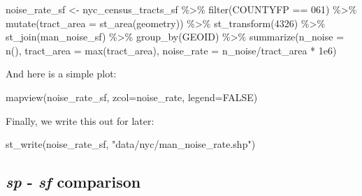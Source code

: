 \documentclass[
  11pt,
]{book}
\newenvironment{Shaded}{\begin{snugshade}}{\end{snugshade}}
\newcommand{\AttributeTok}[1]{\textcolor[rgb]{0.77,0.63,0.00}{#1}}
\newcommand{\ConstantTok}[1]{\textcolor[rgb]{0.00,0.00,0.00}{#1}}
\newcommand{\DecValTok}[1]{\textcolor[rgb]{0.00,0.00,0.81}{#1}}
\newcommand{\FloatTok}[1]{\textcolor[rgb]{0.00,0.00,0.81}{#1}}
\newcommand{\FunctionTok}[1]{\textcolor[rgb]{0.00,0.00,0.00}{#1}}
\newcommand{\NormalTok}[1]{#1}
\newcommand{\OtherTok}[1]{\textcolor[rgb]{0.56,0.35,0.01}{#1}}
\newcommand{\SpecialCharTok}[1]{\textcolor[rgb]{0.00,0.00,0.00}{#1}}
\newcommand{\StringTok}[1]{\textcolor[rgb]{0.31,0.60,0.02}{#1}}
\begin{document}
\begin{Shaded}
\begin{Highlighting}[]
\NormalTok{noise\_rate\_sf }\OtherTok{\textless{}{-}}\NormalTok{ nyc\_census\_tracts\_sf }\SpecialCharTok{\%\textgreater{}\%} 
      \FunctionTok{filter}\NormalTok{(COUNTYFP }\SpecialCharTok{==} \StringTok{\textquotesingle{}061\textquotesingle{}}\NormalTok{) }\SpecialCharTok{\%\textgreater{}\%}
      \FunctionTok{mutate}\NormalTok{(}\AttributeTok{tract\_area =} \FunctionTok{st\_area}\NormalTok{(geometry)) }\SpecialCharTok{\%\textgreater{}\%}
      \FunctionTok{st\_transform}\NormalTok{(}\DecValTok{4326}\NormalTok{) }\SpecialCharTok{\%\textgreater{}\%}
      \FunctionTok{st\_join}\NormalTok{(man\_noise\_sf) }\SpecialCharTok{\%\textgreater{}\%}
      \FunctionTok{group\_by}\NormalTok{(GEOID) }\SpecialCharTok{\%\textgreater{}\%} 
      \FunctionTok{summarize}\NormalTok{(}\AttributeTok{n\_noise =} \FunctionTok{n}\NormalTok{(),}
                \AttributeTok{tract\_area =} \FunctionTok{max}\NormalTok{(tract\_area),}
                \AttributeTok{noise\_rate =}\NormalTok{ n\_noise}\SpecialCharTok{/}\NormalTok{tract\_area }\SpecialCharTok{*} \FloatTok{1e6}\NormalTok{) }
\end{Highlighting}
\end{Shaded}

And here is a simple plot:

\begin{Shaded}
\begin{Highlighting}[]
\FunctionTok{mapview}\NormalTok{(noise\_rate\_sf, }\AttributeTok{zcol=}\StringTok{\textquotesingle{}noise\_rate\textquotesingle{}}\NormalTok{, }\AttributeTok{legend=}\ConstantTok{FALSE}\NormalTok{)}
\end{Highlighting}
\end{Shaded}

Finally, we write this out for later:

\begin{Shaded}
\begin{Highlighting}[]
\FunctionTok{st\_write}\NormalTok{(noise\_rate\_sf, }\StringTok{"data/nyc/man\_noise\_rate.shp"}\NormalTok{)}
\end{Highlighting}
\end{Shaded}

\hypertarget{sp---sf-comparison}{%
\subsection{\texorpdfstring{\emph{sp} - \emph{sf} comparison}{sp - sf comparison}}\label{sp---sf-comparison}}
\end{document}
